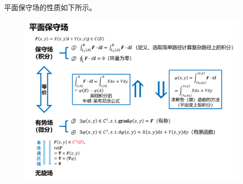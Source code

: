 \documentclass[12pt,UTF8]{ctexart}
\begin{document}
平面保守场的性质如下所示。

\begin{figure}[H]
\begin{center}
\includegraphics[height=0.54\textheight]{Figures25/PlaneConserv.png}
\end{center}
\end{figure}
\end{document}
